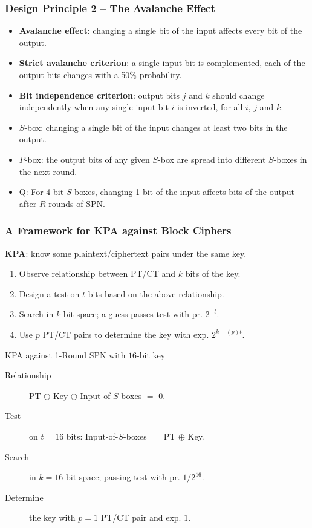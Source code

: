 \begin{frame}\frametitle{Design Principle 2 -- The Avalanche Effect}
\begin{itemize}
\item \textbf{Avalanche effect}: changing a single bit of the input affects every bit of the output.
\item \textbf{Strict avalanche criterion}: a single input bit is complemented, each of the output bits changes with a 50\% probability.
\item \textbf{Bit independence criterion}: output bits $j$ and $k$ should change independently when any single input bit $i$ is inverted, for all $i$, $j$ and $k$.
\item $S$-box: changing a single bit of the input changes at least two bits in the output.
\item $P$-box: the output bits of any given $S$-box are spread into different $S$-boxes in the next round.
\item \alert{Q: For 4-bit $S$-boxes, changing 1 bit of the input affects \underline{\qquad} bits of the output after $R$ rounds of SPN.}
\end{itemize}
\end{frame}
\begin{frame}\frametitle{A Framework for KPA against Block Ciphers}
\textbf{KPA}: know some plaintext/ciphertext pairs under the same key.
\begin{enumerate}
\item Observe relationship between PT/CT and $k$ bits of the key. 
\item Design a test on $t$ bits based on the above relationship.
\item Search in $k$-bit space; a guess passes test with pr. $2^{-t}$.
\item Use $p$ PT/CT pairs to determine the key with exp. $2^{k-(p)t}$.
\end{enumerate}
\begin{exampleblock}{KPA against 1-Round SPN with $16$-bit key}
\begin{description}
\item[Relationship] PT $\oplus$ Key $\oplus$ Input-of-$S$-boxes $=$ 0.
\item[Test] on $t=16$ bits: Input-of-$S$-boxes $=$ PT $\oplus$ Key.
\item[Search] in $k=16$ bit space; passing test with pr. $1/2^{16}$.
\item[Determine] the key with $p=1$ PT/CT pair and exp. $1$.
\end{description}
\end{exampleblock}
\end{frame}
